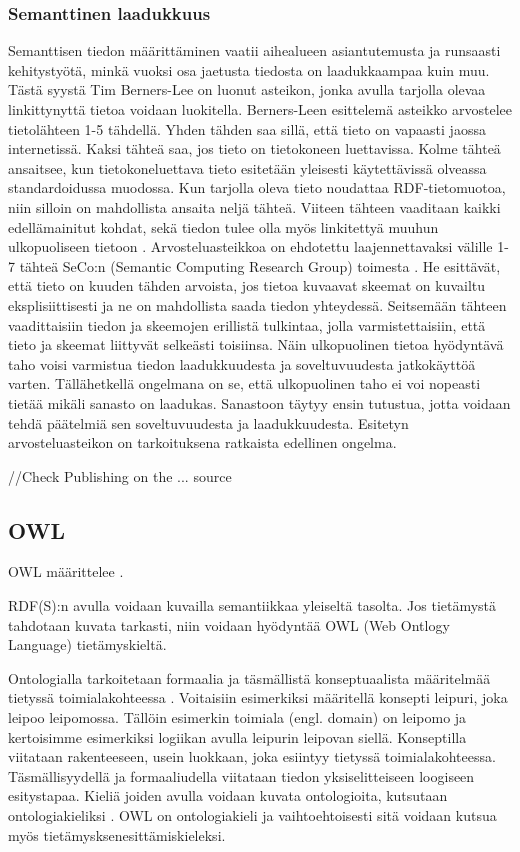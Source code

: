 \documentclass[finnish, 12pt, a4paper, elec, utf8, pdfa, online]{aaltothesis}
\begin{document}
\subsubsection{Semanttinen laadukkuus}
Semanttisen tiedon määrittäminen vaatii aihealueen asiantutemusta ja runsaasti kehitystyötä, minkä vuoksi osa jaetusta tiedosta on laadukkaampaa kuin muu. Tästä syystä Tim Berners-Lee on luonut asteikon, jonka avulla tarjolla olevaa linkittynyttä tietoa voidaan luokitella. Berners-Leen esittelemä asteikko arvostelee tietolähteen 1-5 tähdellä. Yhden tähden saa sillä, että tieto on vapaasti jaossa internetissä. Kaksi tähteä saa, jos tieto on tietokoneen luettavissa. Kolme tähteä ansaitsee, kun tietokoneluettava tieto esitetään yleisesti käytettävissä olveassa standardoidussa muodossa. Kun tarjolla oleva tieto noudattaa RDF-tietomuotoa, niin silloin on mahdollista ansaita neljä tähteä. Viiteen tähteen vaaditaan kaikki edellämainitut kohdat, sekä tiedon tulee olla myös linkitettyä muuhun ulkopuoliseen tietoon \cite{Tim-BL}. Arvosteluasteikkoa on ehdotettu laajennettavaksi välille 1-7 tähteä SeCo:n (Semantic Computing Research Group) toimesta \cite{SeCo_stars}. He esittävät, että tieto on kuuden tähden arvoista, jos tietoa kuvaavat skeemat on kuvailtu eksplisiittisesti ja ne on mahdollista saada tiedon yhteydessä. Seitsemään tähteen vaadittaisiin tiedon ja skeemojen erillistä tulkintaa, jolla varmistettaisiin, että tieto ja skeemat liittyvät selkeästi toisiinsa. Näin ulkopuolinen tietoa hyödyntävä taho voisi varmistua tiedon laadukkuudesta ja soveltuvuudesta jatkokäyttöä varten. Tällähetkellä ongelmana on se, että ulkopuolinen taho ei voi nopeasti tietää mikäli sanasto on laadukas. Sanastoon täytyy ensin tutustua, jotta voidaan tehdä päätelmiä sen soveltuvuudesta ja laadukkuudesta. Esitetyn arvosteluasteikon on tarkoituksena ratkaista edellinen ongelma.

//Check Publishing on the ... source


\subsection{OWL}

OWL määrittelee \cite{OWL_specification}.

RDF(S):n avulla voidaan kuvailla semantiikkaa yleiseltä tasolta. Jos tietämystä tahdotaan kuvata tarkasti, niin voidaan hyödyntää OWL (Web Ontlogy Language) tietämyskieltä.

Ontologialla tarkoitetaan formaalia ja täsmällistä konseptuaalista määritelmää tietyssä toimialakohteessa \cite{Antoniou}. Voitaisiin esimerkiksi määritellä konsepti leipuri, joka leipoo leipomossa. Tällöin esimerkin toimiala (engl. domain) on leipomo ja kertoisimme esimerkiksi logiikan avulla leipurin leipovan siellä. Konseptilla viitataan rakenteeseen, usein luokkaan, joka esiintyy tietyssä toimialakohteessa. Täsmällisyydellä ja formaaliudella viitataan tiedon yksiselitteiseen loogiseen esitystapaa. Kieliä joiden avulla voidaan kuvata ontologioita, kutsutaan ontologiakieliksi \cite{Antoniou}. OWL on ontologiakieli ja vaihtoehtoisesti sitä voidaan kutsua myös tietämysksenesittämiskieleksi.
\end{document}
